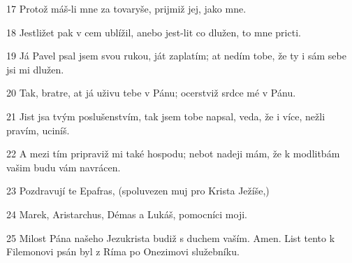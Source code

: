 \par 17 Protož máš-li mne za tovaryše, prijmiž jej, jako mne.
\par 18 Jestližet pak v cem ublížil, anebo jest-lit co dlužen, to mne pricti.
\par 19 Já Pavel psal jsem svou rukou, ját zaplatím; at nedím tobe, že ty i sám sebe jsi mi dlužen.
\par 20 Tak, bratre, at já uživu tebe v Pánu; ocerstviž srdce mé v Pánu.
\par 21 Jist jsa tvým poslušenstvím, tak jsem tobe napsal, veda, že i více, nežli pravím, uciníš.
\par 22 A mezi tím pripraviž mi také hospodu; nebot nadeji mám, že k modlitbám vašim budu vám navrácen.
\par 23 Pozdravují te Epafras, (spoluvezen muj pro Krista Ježíše,)
\par 24 Marek, Aristarchus, Démas a Lukáš, pomocníci moji.
\par 25 Milost Pána našeho Jezukrista budiž s duchem vaším. Amen. List tento k Filemonovi psán byl z Ríma po Onezimovi služebníku.


